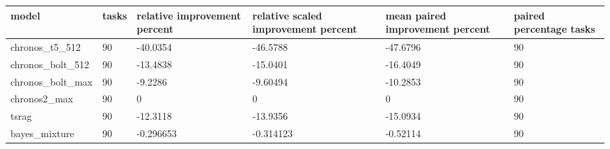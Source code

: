 \begin{tabular}{llllll}
\toprule
model & tasks & relative improvement percent & relative scaled improvement percent & mean paired improvement percent & paired percentage tasks \\
\midrule
chronos\_t5\_512 & 90 & -40.0354 & -46.5788 & -47.6796 & 90 \\
chronos\_bolt\_512 & 90 & -13.4838 & -15.0401 & -16.4049 & 90 \\
chronos\_bolt\_max & 90 & -9.2286 & -9.60494 & -10.2853 & 90 \\
chronos2\_max & 90 & 0 & 0 & 0 & 90 \\
tsrag & 90 & -12.3118 & -13.9356 & -15.0934 & 90 \\
bayes\_mixture & 90 & -0.296653 & -0.314123 & -0.52114 & 90 \\
\bottomrule
\end{tabular}
